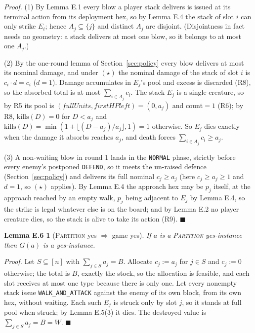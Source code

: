 \documentclass[11pt,a4paper]{article}
\theoremstyle{plain}
\newtheorem*{lemEyesone}{Lemma E.6}
\theoremstyle{definition}
\theoremstyle{plain}
\theoremstyle{definition}
\theoremstyle{remark}
\newcommand{\PARTITION}{\textsc{Partition}}
\newcommand{\qedbox}{\hfill$\blacksquare$}
\begin{document}
\noindent\emph{Proof.} (1) By Lemma E.1 every blow a player stack delivers is issued at its
terminal action from its deployment hex, so by Lemma E.4 the stack of slot $i$ can only
strike $E_i$; hence $A_j\subseteq\{j\}$ and distinct $A_j$ are disjoint. (Disjointness in
fact needs no geometry: a stack delivers at most one blow, so it belongs to at most one
$A_j$.)

(2) By the one-round lemma of Section~\ref{sec:policy} every blow delivers at most its
nominal damage, and under $(\star)$ the nominal damage of the stack of slot $i$ is
$c_i\cdot d=c_i$ ($d=1$). Damage accumulates in $E_j$'s pool and excess is discarded (R8), so
the absorbed total is at most $\sum_{i\in A_j}c_i$. The stack $E_j$ is a single creature, so
by R5 its pool is $(\mathit{fullUnits},\mathit{firstHPleft})=(0,a_j)$ and
$\mathrm{count}=1$ (R6); by R8, $\mathrm{kills}(D)=0$ for $D<a_j$ and
$\mathrm{kills}(D)=\min(1+\lfloor (D-a_j)/a_j\rfloor,1)=1$ otherwise. So $E_j$ dies exactly
when the damage it absorbs reaches $a_j$, and death forces $\sum_{i\in A_j}c_i\ge a_j$.

(3) A non-waiting blow in round 1 lands in the \texttt{NORMAL} phase, strictly before every
enemy's postponed \texttt{DEFEND}, so it meets the un-raised defence
(Section~\ref{sec:policy}) and delivers its full nominal $c_j\ge a_j$ (here $c_j\ge a_j\ge 1$
and $d=1$, so $(\star)$ applies). By Lemma E.4 the approach hex may be $p_j$ itself, at
the approach reached by an empty walk, $p_j$ being adjacent to $E_j$ by Lemma E.4, so the strike is legal whatever else is on the board; and by Lemma E.2
no player creature dies, so the stack is alive to take its action (R9). \qedbox

\begin{lemEyesone}[\PARTITION{} yes $\Longrightarrow$ game yes]
If $a$ is a \PARTITION{} yes-instance then $G(a)$ is a yes-instance.
\end{lemEyesone}

\noindent\emph{Proof.} Let $S\subseteq[n]$ with $\sum_{j\in S}a_j=B$. Allocate $c_j:=a_j$
for $j\in S$ and $c_j:=0$ otherwise; the total is $B$, exactly the stock, so the allocation
is feasible, and each slot receives at most one type because there is only one. Let every
nonempty stack issue \texttt{WALK\_AND\_ATTACK} against the enemy of its own block, from its
own hex, without waiting. Each such $E_j$ is struck only by slot $j$, so it stands at full
pool when struck; by Lemma E.5(3) it dies. The destroyed value is
$\sum_{j\in S}a_j=B=W$. \qedbox
\end{document}
